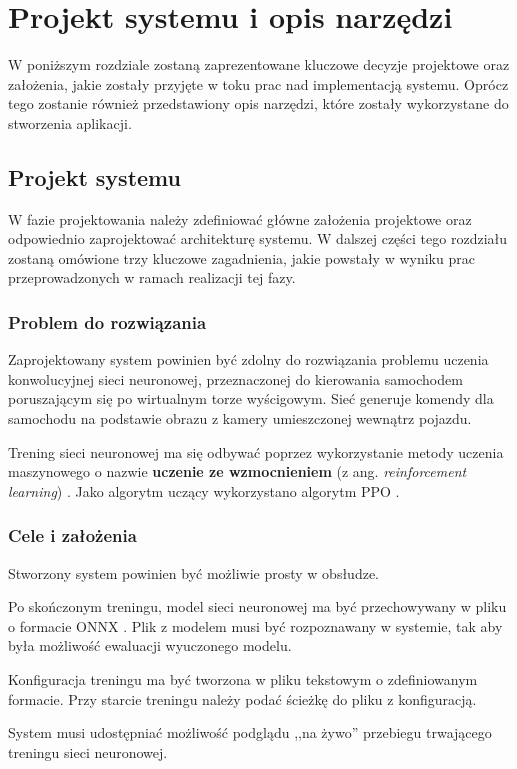\chapter{Projekt systemu i opis narzędzi}
\label{DesignSystemChapter}
W poniższym rozdziale zostaną zaprezentowane kluczowe decyzje projektowe oraz założenia, jakie zostały przyjęte w toku prac nad implementacją systemu. Oprócz tego zostanie również przedstawiony opis narzędzi, które zostały wykorzystane do stworzenia aplikacji.

\section{Projekt systemu}
W fazie projektowania należy zdefiniować główne założenia projektowe oraz odpowiednio zaprojektować architekturę systemu. W dalszej części tego rozdziału zostaną omówione trzy kluczowe zagadnienia, jakie powstały w wyniku prac przeprowadzonych w ramach realizacji tej fazy.

\subsection{Problem do rozwiązania}
Zaprojektowany system powinien być zdolny do rozwiązania problemu uczenia konwolucyjnej sieci neuronowej, przeznaczonej do kierowania samochodem poruszającym się po wirtualnym torze wyścigowym. Sieć generuje komendy dla samochodu na podstawie obrazu z kamery umieszczonej wewnątrz pojazdu.

Trening sieci neuronowej ma się odbywać poprzez wykorzystanie metody uczenia maszynowego o nazwie \textbf{uczenie ze wzmocnieniem} (z ang. \textit{reinforcement learning}) \cite{deepRL:guide}. Jako algorytm uczący wykorzystano algorytm PPO \cite{ppo:opis}.

\subsection{Cele i założenia}
\begin{enumerate*}
\item Stworzony system powinien być możliwie prosty w obsłudze.
\item Po skończonym treningu, model sieci neuronowej ma być przechowywany w pliku o formacie ONNX \cite{onnx:website}. Plik z modelem musi być rozpoznawany w systemie, tak aby była możliwość ewaluacji wyuczonego modelu.
\item Konfiguracja treningu ma być tworzona w pliku tekstowym o zdefiniowanym formacie. Przy starcie treningu należy podać ścieżkę do pliku z konfiguracją.
\item System musi udostępniać możliwość podglądu ,,na żywo'' przebiegu trwającego treningu sieci neuronowej.
\end{enumerate*}

